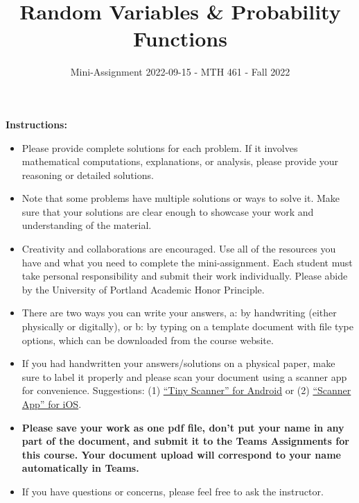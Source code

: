 \documentclass[
]{article}
\title{\textbf{Random Variables \& Probability Functions}}
\subtitle{Mini-Assignment 2022-09-15 - MTH 461 - Fall 2022}
\author{}
\date{\vspace{-2.5em}}
\begin{document}
\maketitle

\hfill\break

\textbf{Instructions:}

\begin{itemize}
\item
  Please provide complete solutions for each problem. If it involves mathematical computations, explanations, or analysis, please provide your reasoning or detailed solutions.
\item
  Note that some problems have multiple solutions or ways to solve it. Make sure that your solutions are clear enough to showcase your work and understanding of the material.
\item
  Creativity and collaborations are encouraged. Use all of the resources you have and what you need to complete the mini-assignment. Each student must take personal responsibility and submit their work individually. Please abide by the University of Portland Academic Honor Principle.
\item
  There are two ways you can write your answers, a: by handwriting (either physically or digitally), or b: by typing on a template document with file type options, which can be downloaded from the course website.
\item
  If you had handwritten your answers/solutions on a physical paper, make sure to label it properly and please scan your document using a scanner app for convenience. Suggestions: (1) \href{https://play.google.com/store/apps/details?id=com.appxy.tinyscanner\&hl=en_US\&gl=US}{``Tiny Scanner'' for Android} or (2) \href{https://apps.apple.com/us/app/scanner-app-scan-pdf-document/id595563753}{``Scanner App'' for iOS}.
\item
  \textbf{Please save your work as one pdf file, don't put your name in any part of the document, and submit it to the Teams Assignments for this course. Your document upload will correspond to your name automatically in Teams.}
\item
  If you have questions or concerns, please feel free to ask the instructor.
\end{itemize}

\newpage
\end{document}

